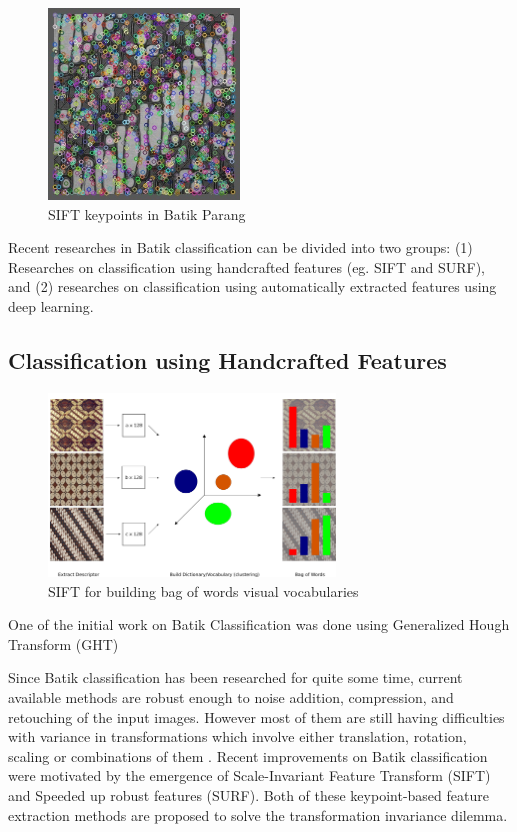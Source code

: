 \documentclass[conference, compsoc]{IEEEtran}
\begin{document}
\begin{figure}[h]
	\begin{center}
		\includegraphics[width=2.0in]{../batik-parang-keypoints}
		\renewcommand{\figurename}{Fig.}		
		\caption{SIFT keypoints in Batik Parang}
		\label{fig_batik_parang_keypoints}
	\end{center}
\end{figure}

Recent researches in Batik classification can be divided into two groups: (1) Researches on classification using handcrafted features (eg. SIFT and SURF), and (2) researches on classification using automatically extracted features using deep learning.

\subsection{Classification using Handcrafted Features}

\begin{figure}[h]
	\begin{center}
		\includegraphics[width=3.0in]{../sift-bag-of-words}
		\renewcommand{\figurename}{Fig.}	
		\caption{SIFT for building bag of words visual vocabularies}
		\label{fig_sift_bag_of_words}
	\end{center}
\end{figure}

One of the initial work on Batik Classification was done using Generalized Hough Transform (GHT) 

Since Batik classification has been researched for quite some time, current available methods are robust enough to noise addition, compression, and retouching of the input images. However most of them are still having difficulties with variance in transformations which involve either translation, rotation, scaling or combinations of them \cite{nurhaida2015automatic}. Recent improvements on Batik classification were motivated by the emergence of Scale-Invariant Feature Transform (SIFT)\cite{lowe2004distinctive} and Speeded up robust features (SURF)\cite{bay2006surf}. Both of these keypoint-based feature extraction methods are proposed to solve the transformation invariance dilemma.
\end{document}
